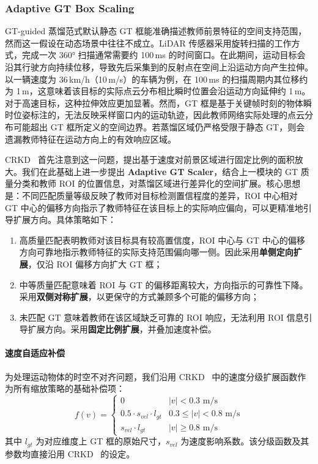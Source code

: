 \documentclass[12pt, UTF8]{ctexart}
\begin{document}
\subsubsection{Adaptive GT Box Scaling}
GT-guided 蒸馏范式默认静态 GT 框能准确描述教师前景特征的空间支持范围，然而这一假设在动态场景中往往不成立。LiDAR 传感器采用旋转扫描的工作方式，完成一次 360° 扫描通常需要约 100\,ms 的时间窗口。在此期间，运动目标会沿其行驶方向持续位移，导致先后采集到的反射点在空间上沿运动方向产生拉伸。以一辆速度为 36\,km/h（10\,m/s）的车辆为例，在 100\,ms 的扫描周期内其位移约为 1\,m，这意味着该目标的实际点云分布相比瞬时位置会沿运动方向延伸约 1\,m。对于高速目标，这种拉伸效应更加显著。然而，GT 框是基于关键帧时刻的物体瞬时位姿标注的，无法反映采样窗口内的运动轨迹，因此教师网络实际处理的点云分布可能超出 GT 框所定义的空间边界。若蒸馏区域仍严格受限于静态 GT，则会遗漏教师特征在运动方向上的有效响应区域。

CRKD~\cite{Zhao_2024_CVPR} 首先注意到这一问题，提出基于速度对前景区域进行固定比例的面积放大。我们在此基础上进一步提出 \textbf{Adaptive GT Scaler}，结合上一模块的 GT 质量分类和教师 ROI 的位置信息，对蒸馏区域进行差异化的空间扩展。核心思想是：不同匹配质量等级反映了教师对目标检测置信程度的差异，ROI 中心相对 GT 中心的偏移方向指示了教师特征在该目标上的实际响应偏向，可以更精准地引导扩展方向。具体策略如下：
\begin{enumerate}
    \item[($\mathbf{1}$)] 高质量匹配表明教师对该目标具有较高置信度，ROI 中心与 GT 中心的偏移方向可靠地指示教师特征的实际支持范围偏向哪一侧。因此采用\textbf{单侧定向扩展}，仅沿 ROI 偏移方向扩大 GT 框；
    \item[($\mathbf{2}$)] 中等质量匹配意味着 ROI 与 GT 的偏移距离较大，方向指示的可靠性下降。采用\textbf{双侧对称扩展}，以更保守的方式兼顾多个可能的偏移方向；
    \item[($\mathbf{3}$)] 未匹配 GT 意味着教师在该区域缺乏可靠的 ROI 响应，无法利用 ROI 信息引导扩展方向。采用\textbf{固定比例扩展}，并叠加速度补偿。
\end{enumerate}

\paragraph{速度自适应补偿}
为处理运动物体的时空不对齐问题，我们沿用 CRKD~\cite{Zhao_2024_CVPR} 中的速度分级扩展函数作为所有缩放策略的基础补偿项：
\begin{equation}
f(v) = \begin{cases}
0 & |v| < 0.3 \text{ m/s} \\
0.5 \cdot s_{vel} \cdot l_{gt} & 0.3 \leq |v| < 0.8 \text{ m/s} \\
s_{vel} \cdot l_{gt} & |v| \geq 0.8 \text{ m/s}
\end{cases}
\end{equation}
其中 $l_{gt}$ 为对应维度上 GT 框的原始尺寸，$s_{vel}$ 为速度影响系数。该分级函数及其参数均直接沿用 CRKD~\cite{Zhao_2024_CVPR} 的设定。
\end{document}
